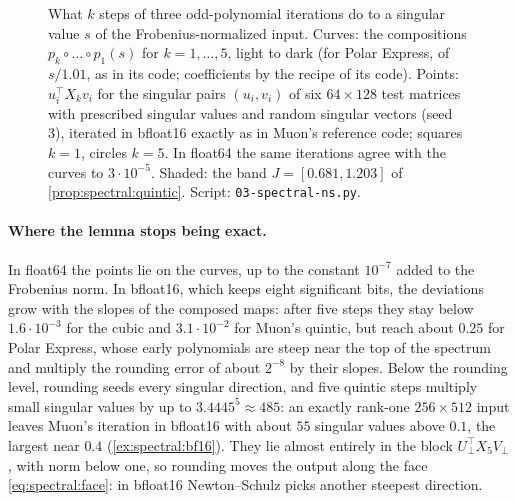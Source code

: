 \begin{refsection}
\begin{figure}[t]
\begin{fullwidth}
\end{fullwidth}
\caption{What $k$ steps of three odd-polynomial iterations do to a singular value $s$ of the Frobenius-normalized input. Curves: the compositions $p_k\circ\dots\circ p_1(s)$ for $k=1,\dots,5$, light to dark (for Polar Express, of $s/1.01$, as in its code; coefficients by the recipe of its code). Points: $u_i^\top X_kv_i$ for the singular pairs $(u_i,v_i)$ of six $64\times128$ test matrices with prescribed singular values and random singular vectors (seed 3), iterated in bfloat16 exactly as in Muon's reference code; squares $k=1$, circles $k=5$. In float64 the same iterations agree with the curves to $3\cdot10^{-5}$. Shaded: the band $J=[0.681,1.203]$ of \cref{prop:spectral:quintic}. Script: \texttt{03-spectral-ns.py}.}
\label{fig:spectral:ns}
\end{figure}

\paragraph{Where the lemma stops being exact.} In float64 the points lie on the curves, up to the constant $10^{-7}$ added to the Frobenius norm. In bfloat16, which keeps eight significant bits, the deviations grow with the slopes of the composed maps: after five steps they stay below $1.6\cdot10^{-3}$ for the cubic and $3.1\cdot10^{-2}$ for Muon's quintic, but reach about $0.25$ for Polar Express, whose early polynomials are steep near the top of the spectrum and multiply the rounding error of about $2^{-8}$ by their slopes. Below the rounding level, rounding seeds every singular direction, and five quintic steps multiply small singular values by up to $3.4445^5\approx485$: an exactly rank-one $256\times512$ input leaves Muon's iteration in bfloat16 with about $55$ singular values above $0.1$, the largest near $0.4$ (\cref{ex:spectral:bf16}). They lie almost entirely in the block $U_\perp^\top X_5V_\perp$, with norm below one, so rounding moves the output along the face \eqref{eq:spectral:face}: in bfloat16 Newton--Schulz picks another steepest direction.


\end{refsection}
